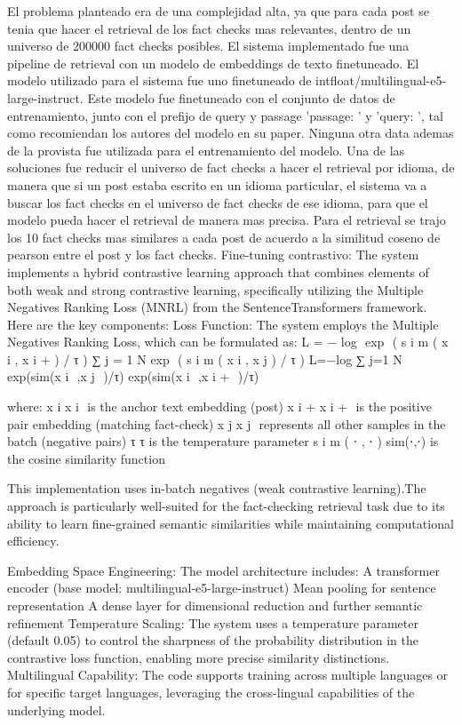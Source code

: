 \documentclass[11pt]{article}
\begin{document}
El problema planteado era de una complejidad alta, ya que para cada post se tenia que hacer el retrieval de los fact checks mas relevantes, dentro de un universo de 200000 fact checks posibles.
El sistema implementado fue una pipeline de retrieval con un modelo de embeddings de texto finetuneado.
El modelo utilizado para el sistema fue uno finetuneado de intfloat/multilingual-e5-large-instruct. Este modelo fue finetuneado con el conjunto de datos de entrenamiento, junto con el prefijo de query y passage 'passage: ' y 'query: ', tal como recomiendan los autores del modelo en su paper. 
Ninguna otra data ademas de la provista fue utilizada para el entrenamiento del modelo. 
Una de las soluciones fue reducir el universo de fact checks a hacer el retrieval por idioma, de manera que si un post estaba escrito en un idioma particular, el sistema va a buscar los fact checks en el universo de fact checks de ese idioma, para que el modelo pueda hacer el retrieval de manera mas precisa.
Para el retrieval se trajo los 10 fact checks mas similares a cada post de acuerdo a la similitud coseno de pearson entre el post y los fact checks.
Fine-tuning contrastivo:
The system implements a hybrid contrastive learning approach that combines elements of both weak and strong contrastive learning, specifically utilizing the Multiple Negatives Ranking Loss (MNRL) from the SentenceTransformers framework. Here are the key components:
Loss Function:
The system employs the Multiple Negatives Ranking Loss, which can be formulated as:
L
=
−
log
⁡
exp
⁡
(
s
i
m
(
x
i
,
x
i
+
)
/
τ
)
∑
j
=
1
N
exp
⁡
(
s
i
m
(
x
i
,
x
j
)
/
τ
)
L=−log 
∑ 
j=1
N
​
 exp(sim(x 
i
​
 ,x 
j
​
 )/τ)
exp(sim(x 
i
​
 ,x 
i
+
​
 )/τ)
​
 
where:
x
i
x 
i
​
  is the anchor text embedding (post)
x
i
+
x 
i
+
​
  is the positive pair embedding (matching fact-check)
x
j
x 
j
​
  represents all other samples in the batch (negative pairs)
τ
τ is the temperature parameter
s
i
m
(
⋅
,
⋅
)
sim(⋅,⋅) is the cosine similarity function

This implementation uses in-batch negatives (weak contrastive learning).The approach is particularly well-suited for the fact-checking retrieval task due to its ability to learn fine-grained semantic similarities while maintaining computational efficiency.

Embedding Space Engineering: The model architecture includes:
A transformer encoder (base model: multilingual-e5-large-instruct)
Mean pooling for sentence representation
A dense layer for dimensional reduction and further semantic refinement
Temperature Scaling: The system uses a temperature parameter (default 0.05) to control the sharpness of the probability distribution in the contrastive loss function, enabling more precise similarity distinctions.
Multilingual Capability: The code supports training across multiple languages or for specific target languages, leveraging the cross-lingual capabilities of the underlying model.
\end{document}
